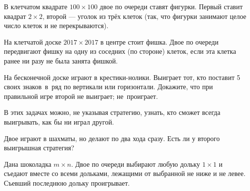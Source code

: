 \documentclass[11pt,a4paper]{article}
\begin{document}


\vspace*{-1truemm}



В клетчатом квадрате $100\times100$ двое по
очереди ставят фигурки.
Первый ставит квадрат $2\times2$, второй
--- уголок из трёх клеток (так, что
фигурки занимают целое число клеток и не перекрываются).

На клетчатой доске $2017\times2017$ в центре
стоит фишка. Двое по очереди передвигают фишку на одну из соседних
(по стороне) клеток, если эта клетка ранее ни разу не была занята фишкой.

На бесконечной доске играют в крестики-нолики.
Выиграет тот, кто поставит 5 своих знаков~в~ряд
по вертикали или горизонтали.
Докажите, что при правильной игре второй
\!\!\!  \!\! не выиграет;
\!\!\!  \!\! не~проиграет.



\vspace*{-1truemm}

{\small В этих задачах можно, не указывая стратегию, узнать, кто сможет всегда выигрывать,
как бы ни играл другой.}

\vspace*{1truemm}

Двое играют в шахматы, но делают
по два хода сразу.
Есть ли у второго выигрышная стратегия?


Дана шоколадка $m\times n$.
Двое по очереди выбирают любую дольку $1\times1$ и съедают
вместе со всеми дольками, лежащими от выбранной не ниже и не левее.
Съевший последнюю дольку проигрывает.
\end{document}
